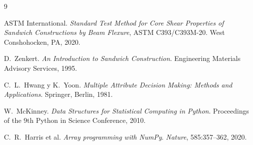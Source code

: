 \documentclass[12pt, a4paper, twocolumn]{article}
\begin{document}
\clearpage
\begin{thebibliography}{9}

ASTM International.
\textit{Standard Test Method for Core Shear Properties of Sandwich Constructions by Beam
Flexure}, ASTM C393/C393M-20.
West Conshohocken, PA, 2020.

D.\ Zenkert.
\textit{An Introduction to Sandwich Construction}.
Engineering Materials Advisory Services, 1995.

C.\ L.\ Hwang y K.\ Yoon.
\textit{Multiple Attribute Decision Making: Methods and Applications}.
Springer, Berlin, 1981.

W.\ McKinney.
\textit{Data Structures for Statistical Computing in Python}.
Proceedings of the 9th Python in Science Conference, 2010.

C.\ R.\ Harris et al.
\textit{Array programming with NumPy}.
\textit{Nature}, 585:357--362, 2020.

\end{thebibliography}
\end{document}
